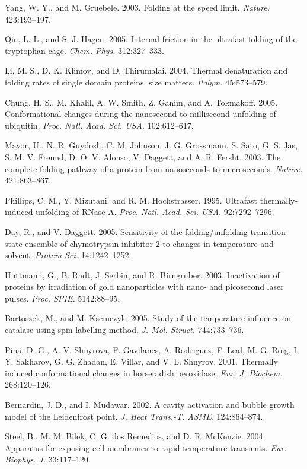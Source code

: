 \documentclass{biophys}
\begin{document}
\begin{thebibliography}{99}
Yang, W. Y., and M. Gruebele. 2003. Folding at the speed limit. {\it Nature.} 423:193--197.

Qiu, L. L., and S. J. Hagen. 2005. Internal friction in the ultrafast folding of the tryptophan cage. {\it Chem. Phys.} 312:327--333.

Li, M. S., D. K. Klimov, and D. Thirumalai. 2004. Thermal denaturation and folding rates of single domain proteins: size matters. {\it Polym.} 45:573--579.

Chung, H. S., M. Khalil, A. W. Smith, Z. Ganim, and A. Tokmakoff. 2005. Conformational changes during the nanosecond-to-millisecond unfolding of ubiquitin.
{\it Proc. Natl. Acad. Sci. USA.} 102:612--617.

Mayor, U., N. R. Guydosh, C. M. Johnson, J. G. Grossmann, S. Sato, G. S. Jas, S. M. V. Freund, D. O. V. Alonso, V. Daggett, and A. R. Fersht. 2003. The complete folding pathway of a protein from nanoseconds to microseconds. {\it Nature.} 421:863--867.

Phillips, C. M., Y. Mizutani, and R. M. Hochstrasser. 1995. Ultrafast thermally-induced unfolding of RNase-A. {\it Proc. Natl. Acad. Sci. USA.} 92:7292--7296.

Day, R., and V. Daggett. 2005. Sensitivity of the folding/unfolding transition state ensemble of chymotrypsin inhibitor 2 to changes in temperature and solvent. {\it Protein Sci.} 14:1242--1252.

Huttmann, G., B. Radt, J. Serbin, and R. Birngruber. 2003. Inactivation of proteins by irradiation of gold nanoparticles with nano- and picosecond laser pulses. {\it Proc. SPIE.} 5142:88--95.

Bartoszek, M., and M. Ksciuczyk. 2005. Study of the temperature influence on catalase using spin labelling method. {\it J. Mol. Struct.} 744:733--736.

Pina, D. G., A. V. Shnyrova, F. Gavilanes, A. Rodriguez, F. Leal, M. G. Roig, I. Y. Sakharov, G. G. Zhadan, E. Villar, and V. L. Shnyrov. 2001. Thermally induced conformational changes in horseradish peroxidase. {\it Eur. J. Biochem.} 268:120--126.

Bernardin, J. D., and I. Mudawar. 2002. A cavity activation and bubble growth model of the Leidenfrost point. {\it J. Heat Trans.-T. ASME.} 124:864--874.

Steel, B., M. M. Bilek, C. G. dos Remedios, and D. R. McKenzie. 2004. Apparatus for exposing cell membranes to rapid temperature transients. {\it Eur. Biophys. J.} 33:117--120.


\end{thebibliography}
\end{document}
